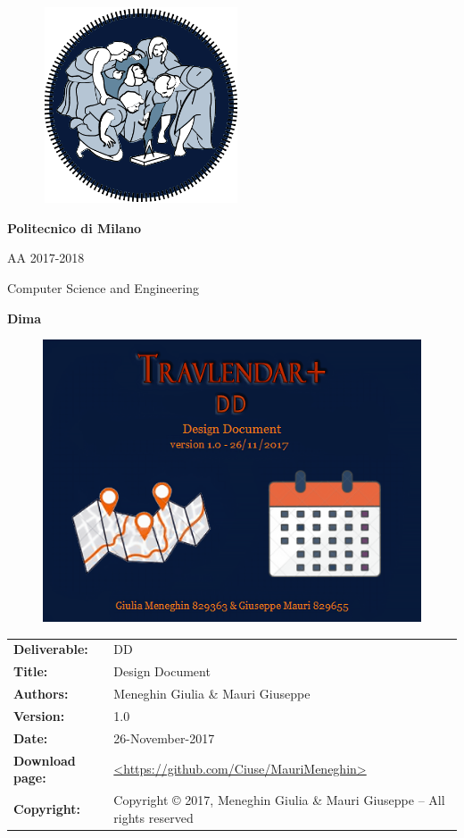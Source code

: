 \documentclass [12pt]{article}
\begin{document}
\begin{figure}[ht!]
\centering
\includegraphics[height=5.8cm,width=5.8cm]{logopoli.png}
\end{figure}
\begin{large}
\centerline{\textbf{Politecnico di Milano} }
\centerline{AA 2017-2018}
\vspace{0.5cm}
\centerline{Computer Science and Engineering}
\centerline{\textbf{Dima}}
\end{large}
\begin{figure}[ht!]
\centering
\includegraphics[width=\linewidth]{Immaginecopertina.png}
\end{figure} 

\clearpage

\begin{table}[h!]
\begin{tabu} to \textwidth { X[0.3,r,p] X[0.7,l,p] }
\hline

\textbf{Deliverable:} & DD\\
\textbf{Title:} & Design Document \\
\textbf{Authors:} & Meneghin Giulia \& Mauri Giuseppe \\
\textbf{Version:} & 1.0 \\ 
\textbf{Date:} & 26-November-2017 \\
\textbf{Download page:} & \url{<https://github.com/Ciuse/MauriMeneghin>} \\
\textbf{Copyright:} & Copyright © 2017, Meneghin Giulia \& Mauri Giuseppe – All rights reserved \\
\hline
\end{tabu}
\end{table}
\end{document}
